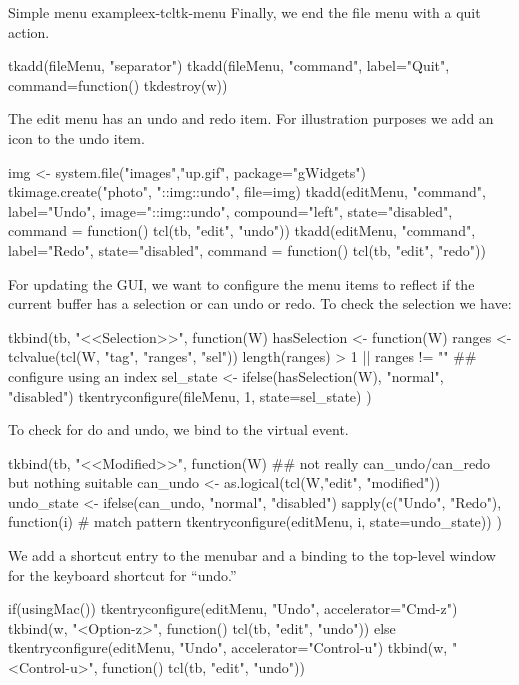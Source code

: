 \begin{example}{Simple menu example}{ex-tcltk-menu}
Finally, we end the file menu with a quit action. 
\begin{Schunk}
\begin{Sinput}
 tkadd(fileMenu, "separator")
 tkadd(fileMenu, "command", label="Quit", 
       command=function() tkdestroy(w))
\end{Sinput}
\end{Schunk}

The edit menu has an undo and redo item. For illustration purposes we add an icon to the undo item.
\begin{Schunk}
\begin{Sinput}
 img <- system.file("images","up.gif", package="gWidgets")
 tkimage.create("photo", "::img::undo", file=img)
 tkadd(editMenu, "command", label="Undo",
       image="::img::undo", compound="left", state="disabled",
       command = function() tcl(tb, "edit", "undo"))
 tkadd(editMenu, "command", label="Redo", state="disabled",
       command = function() tcl(tb, "edit", "redo"))
\end{Sinput}
\end{Schunk}

For updating the GUI, we want to configure the menu items to reflect
if the current buffer has a selection or can undo or redo. To check
the selection we have:
\begin{Schunk}
\begin{Sinput}
 tkbind(tb, "<<Selection>>", function(W) {
   hasSelection <- function(W) {
     ranges <- tclvalue(tcl(W, "tag", "ranges", "sel"))
     length(ranges) > 1 || ranges != ""
   }
   ## configure using an index
   sel_state <- ifelse(hasSelection(W), "normal", "disabled")
   tkentryconfigure(fileMenu, 1, state=sel_state)
 })
\end{Sinput}
\end{Schunk}
To check for do and undo, we bind to the  virtual event.
\begin{Schunk}
\begin{Sinput}
 tkbind(tb, "<<Modified>>", function(W) {
   ## not really can_undo/can_redo but nothing suitable
   can_undo <- as.logical(tcl(W,"edit", "modified"))
   undo_state <- ifelse(can_undo, "normal", "disabled")
   sapply(c("Undo", "Redo"), function(i)        # match pattern
          tkentryconfigure(editMenu, i, state=undo_state)) 
 })
\end{Sinput}
\end{Schunk}


We add a shortcut entry to the menubar and a binding to the
top-level window for the keyboard shortcut for ``undo.''
\begin{Schunk}
\begin{Sinput}
 if(usingMac()) {
   tkentryconfigure(editMenu, "Undo", accelerator="Cmd-z")
   tkbind(w, "<Option-z>", function() tcl(tb, "edit", "undo"))
 } else {
   tkentryconfigure(editMenu, "Undo", accelerator="Control-u")
   tkbind(w, "<Control-u>", function() tcl(tb, "edit", "undo"))
 }
\end{Sinput}
\end{Schunk}
%


\end{example}
